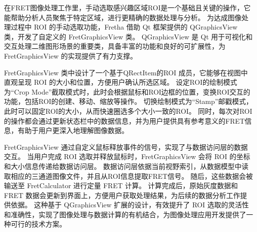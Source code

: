 在FRET图像处理工作里，手动选取感兴趣区域ROI是一个基础且关键的操作，它能帮助分析人员聚焦于特定区域，进行更精确的数据处理与分析。
为达成图像处理过程中 ROI 的手动选取功能，Fretha 借助 Qt 框架提供的 QGraphicsView 类，开发了自定义的 FretGraphicsView 类。
QGraphicsView 是 Qt 用于可视化和交互处理二维图形场景的重要类，具备丰富的功能和良好的可扩展性，为 FretGraphicsView 的实现提供了有力支撑。

FretGraphicsView 类中设计了一个基于QRectItem的ROI 成员，它能够在视图中直观呈现 ROI 的大小和位置，方便用户确认所选区域。
设定ROI的绘制模式为“Crop Mode”截取模式时，此时会根据鼠标和ROI边框的位置，变换ROI交互的功能，包括ROI的创建、移动、缩放等操作。
切换绘制模式为“Stamp”邮戳模式，此时可以固定ROI的大小，从而快速圈选多个大小一致的ROI。
同时，每次对ROI的操作都会通过更新状态栏中的数据信息，并为用户提供具有参考意义的FRET信息，有助于用户更深入地理解图像数据。

FretGraphicsView 通过自定义鼠标释放事件的信号，实现了与数据访问层的数据交互。
当用户完成 ROI 选取并释放鼠标时，FretGraphicsView 会将 ROI 的坐标和大小信息传递给数据访问层。
数据访问层依据当前视野索引，从数据模型中读取相应的三通道图像文件，并且从ROI信息提取FRET信号。
随后，这些数据会被输送至 FretCalculator 进行定量 FRET 计算。
计算完成后，原始灰度数据和 FRET 数据会更新到界面上，方便用户获取处理结果，为后续的数据分析工作提供依据。
这种基于 QGraphicsView 扩展的设计，有效提升了 ROI 选取的灵活性和准确性，实现了图像处理与数据计算的有机结合，为图像处理应用开发提供了一种可行的技术方案。 

